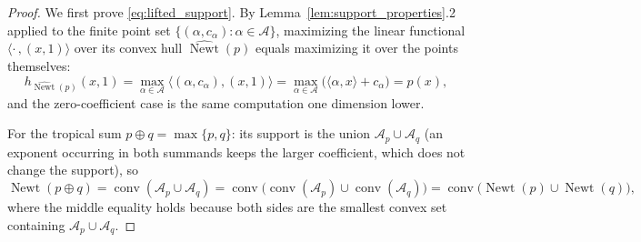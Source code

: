 \begin{proof}
We first prove \eqref{eq:lifted_support}. By Lemma~\ref{lem:support_properties}.2 applied to the finite point set $\{(\alpha, c_\alpha) : \alpha \in \mathcal{A}\}$, maximizing the linear functional $\langle \cdot\,, (x,1) \rangle$ over its convex hull $\widehat{\operatorname{Newt}}(p)$ equals maximizing it over the points themselves:
\begin{equation*}
	h_{\widehat{\operatorname{Newt}}(p)}(x, 1)
	= \max_{\alpha \in \mathcal{A}} \bigl\langle (\alpha, c_{\alpha}), (x, 1) \bigr\rangle
	= \max_{\alpha \in \mathcal{A}} \bigl( \langle \alpha, x \rangle + c_{\alpha} \bigr)
	= p(x),
\end{equation*}
and the zero-coefficient case is the same computation one dimension lower.

For the tropical sum $p \oplus q = \max\{p, q\}$: its support is the union $\mathcal{A}_p \cup \mathcal{A}_q$ (an exponent occurring in both summands keeps the larger coefficient, which does not change the support), so
\begin{equation*}
	\operatorname{Newt}(p \oplus q) = \operatorname{conv}(\mathcal{A}_p \cup \mathcal{A}_q) = \operatorname{conv}\bigl( \operatorname{conv}(\mathcal{A}_p) \cup \operatorname{conv}(\mathcal{A}_q) \bigr) = \operatorname{conv}\bigl( \operatorname{Newt}(p) \cup \operatorname{Newt}(q) \bigr),
\end{equation*}
where the middle equality holds because both sides are the smallest convex set containing $\mathcal{A}_p \cup \mathcal{A}_q$.


\end{proof}
